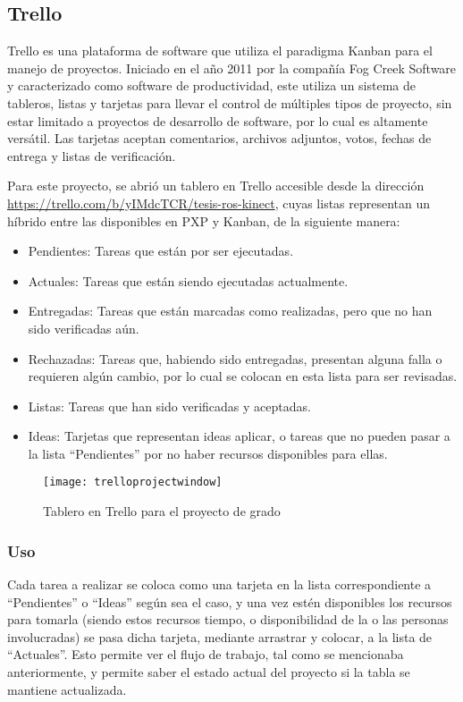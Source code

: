 \subsection{Trello}

Trello es una plataforma de software que utiliza el paradigma Kanban para el manejo de proyectos. Iniciado en el año 2011 por la compañía Fog Creek Software y caracterizado como software de productividad, este utiliza un sistema de tableros, listas y tarjetas para llevar el control de múltiples tipos de proyecto, sin estar limitado a proyectos de desarrollo de software, por lo cual es altamente versátil. Las tarjetas aceptan comentarios, archivos adjuntos, votos, fechas de entrega y listas de verificación.

Para este proyecto, se abrió un tablero en Trello accesible desde la dirección \url{https://trello.com/b/yIMdcTCR/tesis-ros-kinect}, cuyas listas representan un híbrido entre las disponibles en PXP y Kanban, de la siguiente manera:

\begin{itemize}
	\itemsep1pt \parskip1pt 
	\item Pendientes: Tareas que están por ser ejecutadas.
	\item Actuales: Tareas que están siendo ejecutadas actualmente.
	\item Entregadas: Tareas que están marcadas como realizadas, pero que no han sido verificadas aún.
	\item Rechazadas: Tareas que, habiendo sido entregadas, presentan alguna falla o requieren algún cambio, por lo cual se colocan en esta lista para ser revisadas.
	\item Listas: Tareas que han sido verificadas y aceptadas.
	\item Ideas: Tarjetas que representan ideas aplicar, o tareas que no pueden pasar a la lista ``Pendientes'' por no haber recursos disponibles para ellas.
\end{itemize}

\begin{figure}[ht]
\centering
\texttt{[image: trelloprojectwindow]}
\caption{Tablero en Trello para el proyecto de grado}
\end{figure}

\subsubsection{Uso}

Cada tarea a realizar se coloca como una tarjeta en la lista correspondiente a ``Pendientes'' o ``Ideas'' según sea el caso, y una vez estén disponibles los recursos para tomarla (siendo estos recursos tiempo, o disponibilidad de la o las personas involucradas) se pasa dicha tarjeta, mediante arrastrar y colocar, a la lista de ``Actuales''. Esto permite ver el flujo de trabajo, tal como se mencionaba anteriormente, y permite saber el estado actual del proyecto si la tabla se mantiene actualizada.

